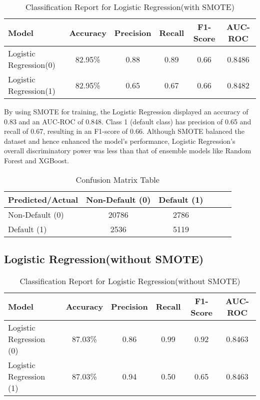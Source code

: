 \documentclass[12pt, a4paper,oneside]{book}
\numberwithin{equation}{section}
\begin{document}
\begin{table}[h!]
\centering
\begin{tabular}{|l|c|c|c|c|c|}
\hline
\textbf{Model} & \textbf{Accuracy} & \textbf{Precision} & \textbf{Recall} & \textbf{F1-Score} & \textbf{AUC-ROC} \\ \hline
Logistic Regression(0) & 82.95\% & 0.88 & 0.89 & 0.66 & 0.8486 \\ \hline
Logistic Regression(1) & 82.95\% & 0.65 & 0.67 & 0.66 & 0.8482 \\ \hline
\end{tabular}
\caption{Classification Report for Logistic Regression(with SMOTE) }
\end{table}

By using SMOTE for training, the Logistic Regression displayed an accuracy of 0.83 and an AUC-ROC of 0.848. Class 1 (default class) has precision of 0.65 and recall of 0.67, resulting in an F1-score of 0.66. Although SMOTE balanced the dataset and hence enhanced the model's performance, Logistic Regression's overall discriminatory power was less than that of ensemble models like Random Forest and XGBoost.
\begin{table}[h!]
\centering
\begin{tabular}{|l|c|c|c|c|c|}
\hline
\textbf{Predicted/Actual} & \textbf{Non-Default (0)} & \textbf{	Default (1)} \\ \hline
Non-Default (0) & 20786 & 2786  \\ \hline
Default (1) & 2536 & 5119  \\ \hline
\end{tabular}
\caption{Confusion Matrix Table}
\end{table}



\subsection{ Logistic Regression(without SMOTE) }

\begin{table}[h!]
\centering
\begin{tabular}{|l|c|c|c|c|c|}
\hline
\textbf{Model} & \textbf{Accuracy} & \textbf{Precision} & \textbf{Recall} & \textbf{F1-Score} & \textbf{AUC-ROC} \\ \hline
Logistic Regression (0) & 87.03\%& 0.86 & 0.99 & 0.92 & 0.8463 \\ \hline
Logistic Regression (1)
& 87.03\%& 0.94 & 0.50 & 0.65 & 0.8463 \\ \hline
\end{tabular}
\caption{Classification Report for Logistic Regression(without SMOTE) }
\end{table}
\end{document}
